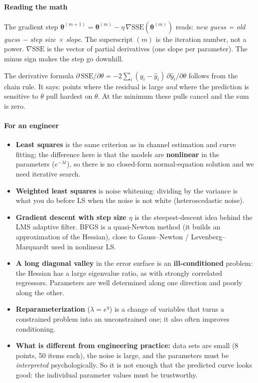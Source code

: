 \paragraph{Reading the math}

The gradient step
\(\boldsymbol\theta^{(m+1)} = \boldsymbol\theta^{(m)} - \eta\,\nabla \mathrm{SSE}(\boldsymbol\theta^{(m)})\)
reads: \emph{new guess = old guess − step size × slope}. The superscript
\((m)\) is the iteration number, not a power. \(\nabla \mathrm{SSE}\) is
the vector of partial derivatives (one slope per parameter). The minus
sign makes the step go downhill.

The derivative formula
\(\partial\,\mathrm{SSE}/\partial\theta = -2\sum_i (y_i - \hat y_i)\,\partial \hat y_i/\partial\theta\)
follows from the chain rule. It says: points where the residual is large
\emph{and} where the prediction is sensitive to \(\theta\) pull hardest
on \(\theta\). At the minimum these pulls cancel and the sum is zero.

\paragraph{For an engineer}

\begin{itemize}
\tightlist
\item
  \textbf{Least squares} is the same criterion as in channel estimation
  and curve fitting; the difference here is that the models are
  \textbf{nonlinear} in the parameters (\(e^{-\lambda t}\)), so there is
  no closed-form normal-equation solution and we need iterative search.
\item
  \textbf{Weighted least squares} is noise whitening: dividing by the
  variance is what you do before LS when the noise is not white
  (heteroscedastic noise).
\item
  \textbf{Gradient descent with step size \(\eta\)} is the
  steepest-descent idea behind the LMS adaptive filter. BFGS is a
  quasi-Newton method (it builds an approximation of the Hessian), close
  to Gauss--Newton / Levenberg--Marquardt used in nonlinear LS.
\item
  \textbf{A long diagonal valley} in the error surface is an
  \textbf{ill-conditioned} problem: the Hessian has a large eigenvalue
  ratio, as with strongly correlated regressors. Parameters are well
  determined along one direction and poorly along the other.
\item
  \textbf{Reparameterization} (\(\lambda = e^{\eta}\)) is a change of
  variables that turns a constrained problem into an unconstrained one;
  it also often improves conditioning.
\item
  \textbf{What is different from engineering practice:} data sets are
  small (8 points, 50 items each), the noise is large, and the
  parameters must be \emph{interpreted} psychologically. So it is not
  enough that the predicted curve looks good: the individual parameter
  values must be trustworthy.
\end{itemize}


